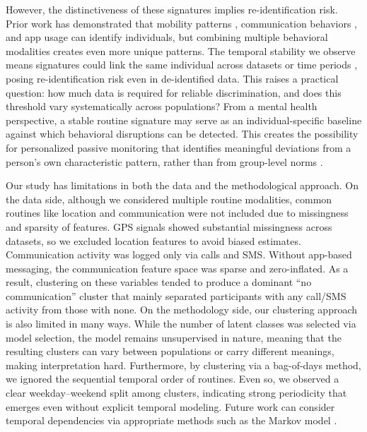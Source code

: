 \documentclass[pdflatex,sn-vancouver,Numbered]{bst/sn-jnl}%
\theoremstyle{thmstyleone}%
\theoremstyle{thmstyletwo}%
\theoremstyle{thmstylethree}%
\begin{document}
However, the distinctiveness of these signatures implies re-identification risk. Prior work has demonstrated that mobility patterns \cite{alessandretti2020scales}, communication behaviors \cite{saramaki2014persistence}, and app usage \cite{sekaraTemporalCulturalLimits2021, malmi2016you} can identify individuals, but combining multiple behavioral modalities creates even more unique patterns. The temporal stability we observe means signatures could link the same individual across datasets or time periods \cite{sekaraTemporalCulturalLimits2021}, posing re-identification risk even in de-identified data. This raises a practical question: how much data is required for reliable discrimination, and does this threshold vary systematically across populations?  From a mental health perspective, a stable
routine signature may serve as an individual-specific baseline against which behavioral disruptions can be detected. This creates the possibility for personalized passive monitoring that identifies meaningful deviations from a person’s own characteristic
pattern, rather than from group-level norms \cite{huckvale2019toward, mohr2017personal}.

Our study has limitations in both the data and the methodological approach. On the data side, although we considered multiple routine modalities, common routines like location and communication were not included due to missingness and sparsity of features. GPS signals showed substantial missingness across datasets, so we excluded location features to avoid biased estimates. Communication activity was logged only via calls and SMS. Without app-based messaging, the communication feature space was sparse and zero-inflated. As a result, clustering on these variables tended to produce a dominant “no communication” cluster that mainly separated participants with any call/SMS activity from those with none. On the methodology side, our clustering approach is also limited in many ways. While the number of latent classes was selected via model selection, the model remains unsupervised in nature, meaning that the resulting clusters can vary between populations or carry different meanings, making interpretation hard. Furthermore, by clustering via a bag-of-days method, we ignored the sequential temporal order of routines. Even so, we observed a clear weekday–weekend split among clusters, indicating strong periodicity that emerges even without explicit temporal modeling. Future work can consider temporal dependencies via appropriate methods such as the Markov model \cite{liuIntraindividualPhenotypingDepression2024, leaningUncoveringSocialStates2025}.
\end{document}
